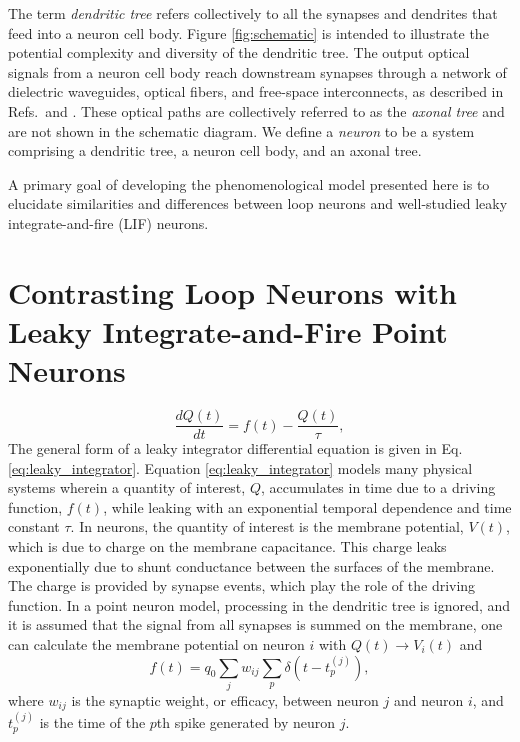 \documentclass[twocolumn]{article}
\newcommand{\onlinecite}[1]{\hspace{-1 ex} \nocite{#1}\citenum{#1}}
\begin{document}
The term \textit{dendritic tree} refers collectively to all the synapses and dendrites that feed into a neuron cell body. Figure \ref{fig:schematic} is intended to illustrate the potential complexity and diversity of the dendritic tree. The output optical signals from a neuron cell body reach downstream synapses through a network of dielectric waveguides, optical fibers, and free-space interconnects, as described in Refs.\,\onlinecite{sh2018_full} and \onlinecite{chbu2017,chbu2018,sh2019_ne}. These optical paths are collectively referred to as the \textit{axonal tree} and are not shown in the schematic diagram. We define a \textit{neuron} to be a system comprising a dendritic tree, a neuron cell body, and an axonal tree.

A primary goal of developing the phenomenological model presented here is to elucidate similarities and differences between loop neurons and well-studied leaky integrate-and-fire (LIF) neurons. 

\cite{clbr2006}

\section{\label{sec:leaky_integrators}Contrasting Loop Neurons with Leaky Integrate-and-Fire Point Neurons}
\begin{equation}
\label{eq:leaky_integrator}
\frac{dQ(t)}{dt} = f(t)-\frac{Q(t)}{\tau},
\end{equation}
The general form of a leaky integrator differential equation is given in Eq.\,\ref{eq:leaky_integrator}. Equation \ref{eq:leaky_integrator} models many physical systems wherein a quantity of interest, $Q$, accumulates in time due to a driving function, $f(t)$, while leaking with an exponential temporal dependence and time constant $\tau$. In neurons, the quantity of interest is the membrane potential, $V(t)$, which is due to charge on the membrane capacitance. This charge leaks exponentially due to shunt conductance between the surfaces of the membrane. The charge is provided by synapse events, which play the role of the driving function. In a point neuron model, processing in the dendritic tree is ignored, and it is assumed that the signal from all synapses is summed on the membrane, one can calculate the membrane potential on neuron $i$ with $Q(t)\rightarrow V_i(t)$ and
\begin{equation}
\label{eq:leaky_integrator__synapse_signal}
f(t) = q_0 \sum_j w_{ij} \sum_p \delta(t-t_p^{(j)}),
\end{equation}
where $w_{ij}$ is the synaptic weight, or efficacy, between neuron $j$ and neuron $i$, and $t_p^{(j)}$ is the time of the $p$th spike generated by neuron $j$.
\end{document}
